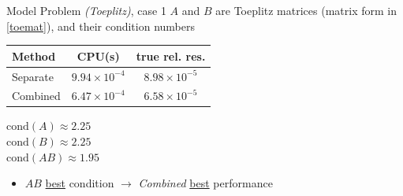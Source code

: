 \documentclass[aspectratio=169]{beamer}
\begin{document}
\begin{frame}{Model Problem \textit{(Toeplitz)}, case 1}
	$A$ and $B$ are Toeplitz matrices (matrix form in \eqref{toemat}), and their condition numbers

	\begin{minipage}[t]{0.63\textwidth}
		\vspace{0pt}
		\centering
		\begin{tabular}{l c c}
			\toprule
			Method & CPU(s) & true rel. res.\\
			\midrule
			Separate& $9.94 \times 10^{-4}$ & $8.98 \times 10^{-5}$ \\
			Combined& \underline{$6.47 \times 10^{-4}$} & \underline{$6.58 \times 10^{-5}$}\\
			\bottomrule
		\end{tabular}
	\end{minipage}%
	\hfill
	\begin{minipage}[t]{0.33\textwidth}
		\vspace{0pt}
		$\mathrm{cond} (A) \approx 2.25 $\\
		$\mathrm{cond} (B) \approx 2.25$\\
		\underline{$\mathrm{cond} (AB) \approx 1.95$}
	\end{minipage}

	\begin{itemize}
		\item $AB$ \underline{best} condition $\rightarrow$ \textit{Combined} \underline{best} performance
	\end{itemize}
\end{frame}
\end{document}
